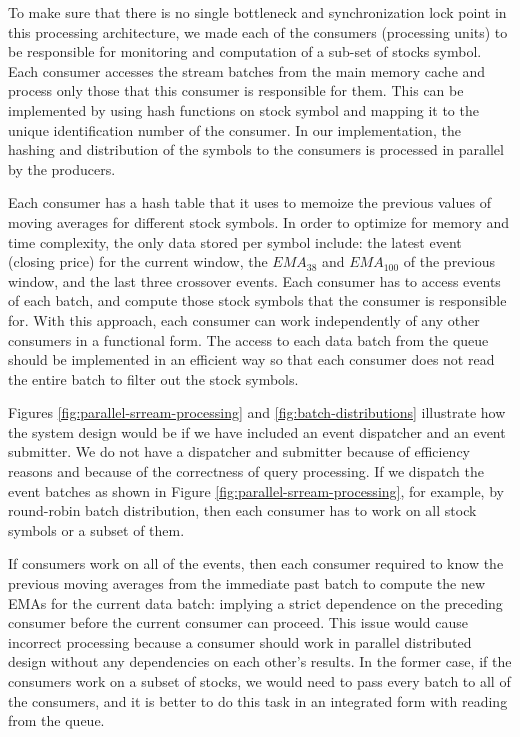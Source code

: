 To make sure that there is no single bottleneck and synchronization lock point in this processing architecture, we made each of the consumers
(processing units) to be responsible for monitoring and computation of a sub-set of stocks symbol. Each consumer accesses the stream batches from the main memory cache and process only those that this consumer is responsible for them. This can be implemented by using hash functions on stock symbol and mapping it to the unique identification number of the consumer. In our implementation, the hashing and distribution of the symbols to the consumers is processed in parallel by the producers.

Each consumer has a hash table that it uses to memoize the previous values of moving averages for different stock symbols. In order to optimize for memory and time complexity, the only data stored per symbol include: the latest event (closing price) for the current window, the $EMA_{38}$ and $EMA_{100}$ of the previous window, and the last three crossover events.
Each consumer has to access events of each batch, and compute those stock symbols that the consumer is responsible for. With this approach, each consumer can work independently of any other consumers in a functional form. The access to each data batch from the queue should be implemented in an efficient way so that each consumer does not read the entire batch to filter out the stock symbols. 

Figures \ref{fig:parallel-srream-processing} and \ref{fig:batch-distributions} illustrate how the system design would be if we have included an event dispatcher and an event submitter. We do not have a dispatcher and submitter because of efficiency reasons and because of the correctness of query processing. 
If we dispatch the event batches as shown in Figure \ref{fig:parallel-srream-processing}, for example, by round-robin batch distribution, then each consumer has to work on all stock symbols or a subset of them. 

If consumers work on all of the events, then each consumer required to know the previous moving averages from the immediate past batch to compute the new EMAs for the current data batch: implying a strict dependence on the preceding consumer before the current consumer can proceed. This issue would cause incorrect processing because a consumer should work in parallel distributed design without any dependencies on each other's results.
In the former case, if the consumers work on a subset of stocks, we would need to pass every batch to all of the consumers, and it is better to do this task in an integrated form with reading from the queue.



